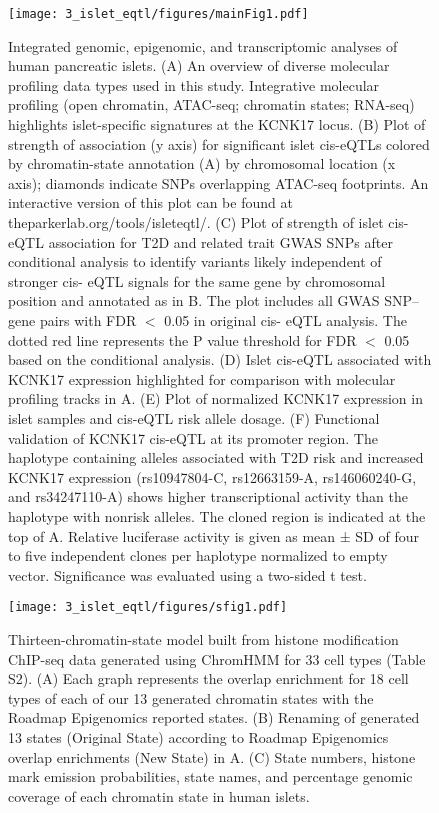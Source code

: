 \begin{figure}
    \centering
    \texttt{[image: 3\_islet\_eqtl/figures/mainFig1.pdf]}
    \caption{Integrated genomic, epigenomic, and transcriptomic analyses of human pancreatic islets. (A) An overview of diverse molecular profiling data types used in this study. Integrative molecular profiling (open chromatin, ATAC-seq; chromatin states; RNA-seq) highlights islet-specific signatures at the KCNK17 locus. (B) Plot of strength of association (y axis) for significant islet cis-eQTLs colored by chromatin-state annotation (A) by chromosomal location (x axis); diamonds indicate SNPs overlapping ATAC-seq footprints. An interactive version of this plot can be found at theparkerlab.org/tools/isleteqtl/. (C) Plot of strength of islet cis-eQTL association for T2D and related trait GWAS SNPs after conditional analysis to identify variants likely independent of stronger cis- eQTL signals for the same gene by chromosomal position and annotated as in B. The plot includes all GWAS SNP–gene pairs with FDR $<$ 0.05 in original cis- eQTL analysis. The dotted red line represents the P value threshold for FDR $<$ 0.05 based on the conditional analysis. (D) Islet cis-eQTL associated with KCNK17 expression highlighted for comparison with molecular profiling tracks in A. (E) Plot of normalized KCNK17 expression in islet samples and cis-eQTL risk allele dosage. (F) Functional validation of KCNK17 cis-eQTL at its promoter region. The haplotype containing alleles associated with T2D risk and increased KCNK17 expression (rs10947804-C, rs12663159-A, rs146060240-G, and rs34247110-A) shows higher transcriptional activity than the haplotype with nonrisk alleles. The cloned region is indicated at the top of A. Relative luciferase activity is given as mean ± SD of four to five independent clones per haplotype normalized to empty vector. Significance was evaluated using a two-sided t test.}
    \label{fig:c2_f1}
\end{figure}


\begin{figure}
    \centering
    \texttt{[image: 3\_islet\_eqtl/figures/sfig1.pdf]}
    \caption{Thirteen-chromatin-state model built from histone modification ChIP-seq data generated using ChromHMM \cite{ernstMappingAnalysisChromatin2011} for 33 cell types (Table S2). (A) Each graph represents the overlap enrichment for 18 cell types of each of our 13 generated chromatin states with the Roadmap Epigenomics \cite{consortiumIntegrativeAnalysis1112015} reported states. (B) Renaming of generated 13 states (Original State) according to Roadmap Epigenomics overlap enrichments (New State) in A. (C) State numbers, histone mark emission probabilities, state names, and percentage genomic coverage of each chromatin state in human islets.}
    \label{fig:c2_sf1}
\end{figure}


